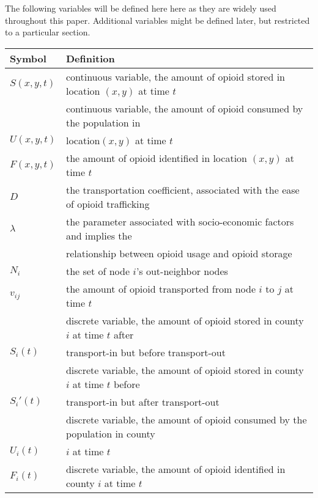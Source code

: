 The following variables will be defined here here as they are widely used throughout this paper. Additional variables might be defined later, but restricted to a particular section.

\begin{table}[H]
\centering
\begin{tabular}{|l|l|}
\hline
\rowcolor[HTML]{656565} 
{\color[HTML]{FFFFFF} \textbf{Symbol}} & {\color[HTML]{FFFFFF} \textbf{Definition}} \\ \hline
$S(x,y,t)$& continuous variable, the amount of opioid stored in location $(x,y)$ at time $t$ \\ \hline
 & continuous variable, the amount of opioid consumed by the population in \\$U(x,y,t)$ &location$(x,y)$ at time $t$  \\ \hline
$F(x,y,t)$& the amount of opioid identified in location $(x,y)$ at time $t$ \\ \hline
$D$ & the transportation coefficient, associated with the ease of opioid trafficking  \\ \hline
$\lambda$ & the parameter associated with socio-economic factors and implies the \\ & relationship between opioid usage and opioid storage  \\ \hline
$N_i$ & the set of node $i$'s out-neighbor nodes \\ \hline
$v_{ij}$ & the amount of opioid transported from node $i$ to $j$ at time $t$ \\ \hline
 & discrete variable, the amount of opioid stored in county $i$ at time $t$ after\\$S_i(t)$& transport-in but before transport-out \\ \hline
 & discrete variable, the amount of opioid stored in county $i$ at time $t$ before\\$S_i'(t)$& transport-in but after transport-out \\ \hline 
 & discrete variable, the amount of opioid consumed by the population in county\\$U_i(t)$& $i$ at time $t$ \\ \hline
$F_i(t)$ & discrete variable, the amount of opioid identified in county $i$ at time $t$ \\ \hline

\end{tabular}
\end{table}

